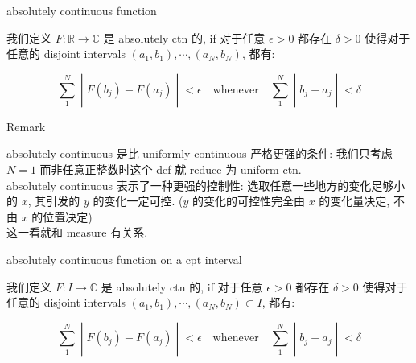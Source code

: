 \documentclass{qlnotes-export}
\begin{document}
\begin{definition}{absolutely continuous function}\label{def-12-differentiation-on-real-spaces-absolutely-continuous-function}

我们定义 \(F:{\mathbb{R}}\rightarrow{\mathbb{C}}\) 是 absolutely ctn 的, if 对于任意 \(\epsilon > 0\) 都存在 \(\delta > 0\) 使得对于任意的 disjoint intervals \((a_{1},b_{1}),\cdots,(a_{N},b_{N})\), 都有:

\[\left. \sum\limits_{1}^{N} \middle| F(b_{j}) - F(a_{j}) \middle| < \epsilon\quad\text{whenever}\quad\sum\limits_{1}^{N} \middle| b_{j} - a_{j} \middle| < \delta \right.\]

\end{definition}

\begin{qlremark}{Remark}

absolutely continuous 是比 uniformly continuous 严格更强的条件: 我们只考虑 \(N = 1\) 而非任意正整数时这个 def 就 reduce 为 uniform ctn.\\
absolutely continuous 表示了一种更强的控制性: 选取任意一些地方的变化足够小的 \(x\), 其引发的 \(y\) 的变化一定可控. (\(y\) 的变化的可控性完全由 \(x\) 的变化量决定, 不由 \(x\) 的位置决定)\\
这一看就和 measure 有关系.

\end{qlremark}

\begin{definition}{absolutely continuous function on a cpt interval}\label{def-12-differentiation-on-real-spaces-absolutely-continuous-function-on-a-cpt-interval}

我们定义 \(F:I\rightarrow{\mathbb{C}}\) 是 absolutely ctn 的, if 对于任意 \(\epsilon > 0\) 都存在 \(\delta > 0\) 使得对于任意的 disjoint intervals \((a_{1},b_{1}),\cdots,(a_{N},b_{N}) \subset I\), 都有:

\[\left. \sum\limits_{1}^{N} \middle| F(b_{j}) - F(a_{j}) \middle| < \epsilon\quad\text{whenever}\quad\sum\limits_{1}^{N} \middle| b_{j} - a_{j} \middle| < \delta \right.\]

\end{definition}
\end{document}
